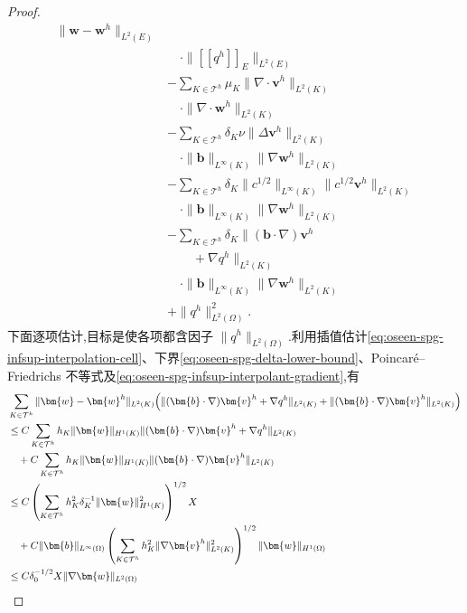 \begin{proof}
\begin{equation*}
\begin{aligned}
       \|\bm{w}-\bm{w}^h\|_{L^2(E)}\\
 &\quad\cdot\|[\![q^h]\!]_E\|_{L^2(E)}\\
 &-\sum_{K\in\mathcal{T}^h}
       \mu_K\|\nabla\cdot\bm{v}^h\|_{L^2(K)}\\
 &\quad\cdot\|\nabla\cdot\bm{w}^h\|_{L^2(K)}\\
 &-\sum_{K\in\mathcal{T}^h}\delta_K\nu
       \|\Delta\bm{v}^h\|_{L^2(K)}\\
 &\quad\cdot\|\bm{b}\|_{L^\infty(K)}
       \|\nabla\bm{w}^h\|_{L^2(K)}\\
 &-\sum_{K\in\mathcal{T}^h}\delta_K
       \|c^{1/2}\|_{L^\infty(K)}
       \|c^{1/2}\bm{v}^h\|_{L^2(K)}\\
 &\quad\cdot\|\bm{b}\|_{L^\infty(K)}
       \|\nabla\bm{w}^h\|_{L^2(K)}\\
 &-\sum_{K\in\mathcal{T}^h}\delta_K
       \bigl\|(\bm{b}\cdot\nabla)\bm{v}^h\\
 &\qquad+\nabla q^h\bigr\|_{L^2(K)}\\
 &\quad\cdot\|\bm{b}\|_{L^\infty(K)}
       \|\nabla\bm{w}^h\|_{L^2(K)}\\
 &+\|q^h\|_{L^2(\Omega)}^2 .
\end{aligned}
\end{equation*}
下面逐项估计,目标是使各项都含因子 $\|q^h\|_{L^2(\Omega)}$.利用插值估计\cref{eq:oseen-spg-infsup-interpolation-cell}、下界\cref{eq:oseen-spg-delta-lower-bound}、Poincaré--Friedrichs 不等式及\cref{eq:oseen-spg-infsup-interpolant-gradient},有
\begin{equation*}
\begin{aligned}
 &\sum_{K\in\mathcal{T}^h}
       \|\bm{w}-\bm{w}^h\|_{L^2(K)}
       \Bigl(\|(\bm{b}\cdot\nabla)\bm{v}^h+\nabla q^h\|_{L^2(K)}
              +\|(\bm{b}\cdot\nabla)\bm{v}^h\|_{L^2(K)}\Bigr)\\
 &\le C\sum_{K\in\mathcal{T}^h}h_K\|\bm{w}\|_{H^1(K)}
       \|(\bm{b}\cdot\nabla)\bm{v}^h+\nabla q^h\|_{L^2(K)}\\
 &\quad+C\sum_{K\in\mathcal{T}^h}h_K\|\bm{w}\|_{H^1(K)}
       \|(\bm{b}\cdot\nabla)\bm{v}^h\|_{L^2(K)}\\
 &\le C\left(\sum_{K\in\mathcal{T}^h}
                  h_K^2\delta_K^{-1}\|\bm{w}\|_{H^1(K)}^2
        \right)^{1/2}X\\
 &\quad+C\|\bm{b}\|_{L^\infty(\Omega)}
       \left(\sum_{K\in\mathcal{T}^h}
                   h_K^2\|\nabla\bm{v}^h\|_{L^2(K)}^2\right)^{1/2}
       \|\bm{w}\|_{H^1(\Omega)}\\
 &\le C\delta_0^{-1/2}X\|\nabla\bm{w}\|_{L^2(\Omega)}\\

\end{aligned}
\end{equation*}
\end{proof}
